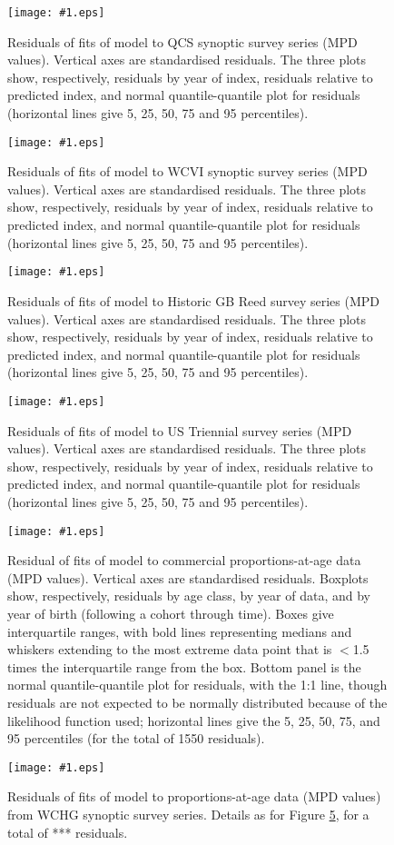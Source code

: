 \documentclass[11pt]{book}
\newcommand\onefig[2]{    %
  \begin{figure}[!htp]
  \begin{center}
	\texttt{[image: \#1.eps]} \\  %
  \end{center}
  \caption{#2 }
  \label{fig:#1} 
  \end{figure}
}
\begin{document}
\onefig{survResQCSoundSynoptic}{Residuals of fits of model to QCS synoptic survey series (MPD values). Vertical axes are standardised residuals. The three plots show, respectively, residuals by year of index, residuals relative to predicted index, and normal quantile-quantile plot for residuals (horizontal lines give 5, 25, 50, 75 and 95 percentiles).}

\clearpage

\onefig{survResWCVISynoptic}{Residuals of fits of model to WCVI synoptic survey series (MPD values). Vertical axes are standardised residuals. The three plots show, respectively, residuals by year of index, residuals relative to predicted index, and normal quantile-quantile plot for residuals (horizontal lines give 5, 25, 50, 75 and 95 percentiles).}

\onefig{survResHistoricGBReed}{Residuals of fits of model to Historic GB Reed survey series (MPD values). Vertical axes are standardised residuals. The three plots show, respectively, residuals by year of index, residuals relative to predicted index, and normal quantile-quantile plot for residuals (horizontal lines give 5, 25, 50, 75 and 95 percentiles).}

\onefig{survResUSTriennial}{Residuals of fits of model to US Triennial survey series (MPD values). Vertical axes are standardised residuals. The three plots show, respectively, residuals by year of index, residuals relative to predicted index, and normal quantile-quantile plot for residuals (horizontal lines give 5, 25, 50, 75 and 95 percentiles).}

\onefig{commAgeResids}{Residual of fits of model to commercial proportions-at-age data (MPD values).  Vertical axes are standardised residuals. Boxplots show, respectively, residuals by age class, by year of data, and by year of birth (following a cohort through time). Boxes give interquartile ranges, with bold lines representing medians and whiskers extending to the most extreme data point that is $<$1.5 times the interquartile range from the box. Bottom panel is the normal quantile-quantile plot for residuals, with the 1:1 line, though residuals are not expected to be normally distributed because of the likelihood function used; horizontal lines give the 5, 25, 50, 75, and 95 percentiles (for the total of 1550 residuals).}

\clearpage

\onefig{survAgeResSer1}{Residuals of fits of model to proportions-at-age data (MPD values) from WCHG synoptic survey series. Details as for Figure \ref{fig:commAgeResids}, for a total of *** residuals.} %
\end{document}
